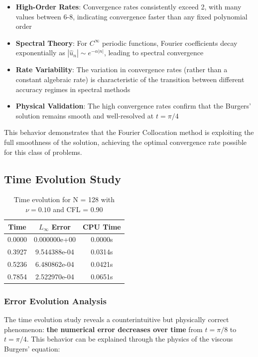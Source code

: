 \begin{itemize}
	\item \textbf{High-Order Rates}: Convergence rates consistently exceed 2, with many values between 6-8, indicating convergence faster than any fixed polynomial order
	\item \textbf{Spectral Theory}: For $C^\infty$ periodic functions, Fourier coefficients decay exponentially as $|\hat{u}_n| \sim e^{-\alpha|n|}$, leading to spectral convergence
	\item \textbf{Rate Variability}: The variation in convergence rates (rather than a constant algebraic rate) is characteristic of the transition between different accuracy regimes in spectral methods
	\item \textbf{Physical Validation}: The high convergence rates confirm that the Burgers' solution remains smooth and well-resolved at $t = \pi/4$
\end{itemize}

This behavior demonstrates that the Fourier Collocation method is exploiting the full smoothness of the solution, achieving the optimal convergence rate possible for this class of problems.

\subsection{Time Evolution Study}
\begin{table}[H]
	\centering
	\begin{tabular}{|c|c|c|}
		\hline
		Time   & $L_\infty$ Error & CPU Time \\
		\hline
		0.0000 & 0.000000e+00     & 0.0000s  \\
		0.3927 & 9.544388e-04     & 0.0314s  \\
		0.5236 & 6.480862e-04     & 0.0421s  \\
		0.7854 & 2.522970e-04     & 0.0651s  \\
		\hline
	\end{tabular}
	\caption{Time evolution for N = 128 with $\nu = 0.10$ and CFL = 0.90}
	\label{tab:time_evolution}
\end{table}

\subsubsection{Error Evolution Analysis}
The time evolution study reveals a counterintuitive but physically correct phenomenon: \textbf{the numerical error decreases over time} from $t = \pi/8$ to $t = \pi/4$. This behavior can be explained through the physics of the viscous Burgers' equation:

